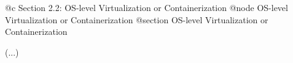 @c Section 2.2: OS-level Virtualization or Containerization
@node OS-level Virtualization or Containerization
@section OS-level Virtualization or Containerization

(...)
